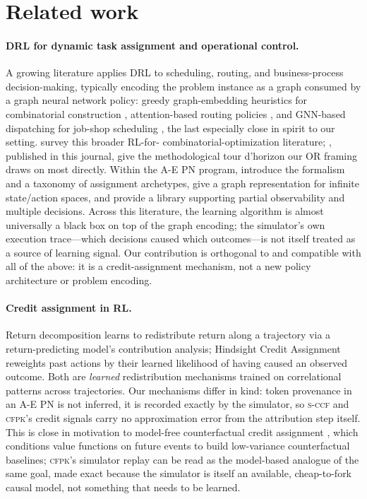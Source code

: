 \documentclass[review,authoryear,3p,times]{elsarticle}
\newcommand{\sccf}{\textsc{s-ccf}}
\newcommand{\cfpk}{\textsc{cfpk}}
\begin{document}
\section{Related work}
\label{sec:related}

\paragraph{DRL for dynamic task assignment and operational control.} A growing
literature applies DRL to scheduling, routing, and business-process
decision-making, typically encoding the problem instance as a graph consumed
by a graph neural network policy: greedy graph-embedding heuristics for
combinatorial construction \citep{khalil2017learning}, attention-based
routing policies \citep{nazari2018vrp}, and GNN-based dispatching for job-shop
scheduling \citep{zhang2020jobshop}, the last especially close in spirit to
our setting. \citet{mazyavkina2021survey} survey this broader RL-for-
combinatorial-optimization literature; \citet{bengio2021tour}, published in
this journal, give the methodological tour d'horizon our OR framing draws on
most directly. Within the A-E PN program, \citet{aepn2023} introduce the
formalism and a taxonomy of assignment archetypes, \citet{aepn_repr2025} give
a graph representation for infinite state/action spaces, and \citet{gympn2025}
provide a library supporting partial observability and multiple decisions.
Across this literature, the learning algorithm is almost universally a black
box on top of the graph encoding; the simulator's own execution trace---which
decisions caused which outcomes---is not itself treated as a source of
learning signal. Our contribution is orthogonal to and compatible with all of
the above: it is a credit-assignment mechanism, not a new policy architecture
or problem encoding.

\paragraph{Credit assignment in RL.} Return decomposition \citep{rudder2019}
learns to redistribute return along a trajectory via a return-predicting
model's contribution analysis; Hindsight Credit Assignment \citep{hca2019}
reweights past actions by their learned likelihood of having caused an
observed outcome. Both are \emph{learned} redistribution mechanisms trained
on correlational patterns across trajectories. Our mechanisms differ in
kind: token provenance in an A-E PN is not inferred, it is recorded exactly by
the simulator, so \sccf{} and \cfpk{}'s credit signals carry no approximation
error from the attribution step itself. This is close in motivation to
model-free counterfactual credit assignment \citep{ccadeep2021}, which
conditions value functions on future events to build low-variance
counterfactual baselines; \cfpk{}'s simulator replay can be read as the model-based
analogue of the same goal, made exact because the simulator is itself an
available, cheap-to-fork causal model, not something that needs to be learned.
\end{document}
